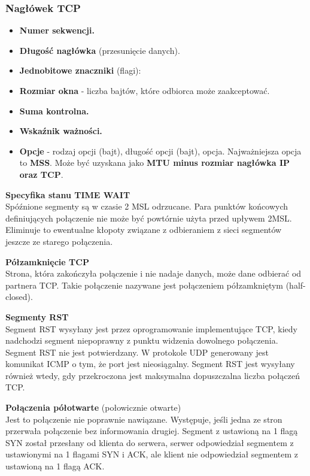 \documentclass[../main.tex]{subfiles}
\begin{document}
    \subsubsection{Nagłówek TCP}
    \begin{itemize}
        \item \textbf{Numer sekwencji.}
        \item \textbf{Długość nagłówka} (przesunięcie danych).
        \item \textbf{Jednobitowe znaczniki} (flagi):
        \item \textbf{Rozmiar okna} - liczba bajtów, które odbiorca może zaakceptować.
        \item \textbf{Suma kontrolna.}
        \item \textbf{Wskaźnik ważności.}
        \item \textbf{Opcje} - rodzaj opcji (bajt), długość opcji (bajt), opcja. Najważniejsza opcja to \textbf{MSS}. Może być uzyskana jako \textbf{MTU minus rozmiar nagłówka IP oraz TCP}.
    \end{itemize}

    \textbf{Specyfika stanu TIME WAIT}\\
    Spóźnione segmenty są w czasie 2 MSL odrzucane. Para
    punktów końcowych definiujących połączenie nie może być powtórnie użyta przed upływem
    2MSL. Eliminuje to ewentualne kłopoty związane z odbieraniem z sieci segmentów jeszcze ze
    starego połączenia.

    \textbf{Półzamknięcie TCP}\\
    Strona, która zakończyła połączenie i nie nadaje danych, może dane odbierać od partnera
    TCP. Takie połączenie nazywane jest połączeniem półzamkniętym (half-closed).

    \textbf{Segmenty RST}\\
    Segment RST wysyłany jest przez oprogramowanie implementujące TCP, kiedy nadchodzi
    segment niepoprawny z punktu widzenia dowolnego połączenia. Segment RST nie jest potwierdzany. W protokole UDP generowany jest komunikat ICMP o tym, że port jest nieosiągalny.
    Segment RST jest wysyłany również wtedy, gdy przekroczona jest maksymalna dopuszczalna
    liczba połączeń TCP.


    \textbf{Połączenia półotwarte} (połowicznie otwarte)\\
    Jest to połączenie nie poprawnie nawiązane. Występuje, jeśli jedna ze stron przerwała połączenie bez informowania drugiej. Segment z ustawioną na 1 flagą SYN został przesłany od
    klienta do serwera, serwer odpowiedział segmentem z ustawionymi na 1 flagami SYN i ACK,
    ale klient nie odpowiedział segmentem z ustawioną na 1 flagą ACK.
\end{document}
